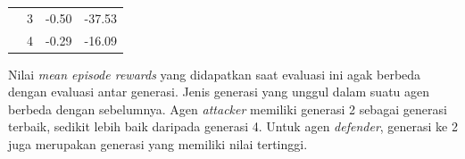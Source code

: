 \begin{table}[H]
\begin{tabular}{|c|c|c|c|}
    & 3                                                                            & -0.50                                                                            & -37.53                                                                           \\ \cline{2-4} 
    & 4                                                                            & -0.29                                                                            & -16.09                                                                           \\ \hline
  \end{tabular}
\end{table}

Nilai \emph{mean episode rewards} yang didapatkan saat evaluasi ini agak berbeda dengan evaluasi antar generasi.
Jenis generasi yang unggul dalam suatu agen berbeda dengan sebelumnya.
Agen \emph{attacker} memiliki generasi 2 sebagai generasi terbaik, sedikit lebih baik daripada generasi 4.
Untuk agen \emph{defender}, generasi ke 2 juga merupakan generasi yang memiliki nilai tertinggi.

